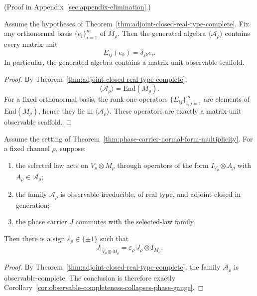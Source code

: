 (Proof in Appendix~\ref{sec:appendix-elimination}.)

\begin{corollary}
\label{cor:adjoint-closed-real-type-matrix-units}
Assume the hypotheses of
Theorem~\ref{thm:adjoint-closed-real-type-complete}. Fix any orthonormal basis
$\{e_i\}_{i=1}^m$ of $M_{\rho}$. Then the generated algebra
$\langle\mathcal A_{\rho}\rangle$ contains every matrix unit
\[
E_{ij}(e_k)=\delta_{jk}e_i.
\]
In particular, the generated algebra contains a matrix-unit observable
scaffold.
\end{corollary}

\begin{proof}
By Theorem~\ref{thm:adjoint-closed-real-type-complete},
\[
\langle\mathcal A_{\rho}\rangle=\mathrm{End}(M_{\rho}).
\]
For a fixed orthonormal basis, the rank-one operators $\{E_{ij}\}_{i,j=1}^m$
are elements of $\mathrm{End}(M_{\rho})$, hence they lie in
$\langle\mathcal A_{\rho}\rangle$. These operators are exactly a matrix-unit
observable scaffold.
\end{proof}

\begin{corollary}
\label{cor:adjoint-closed-real-type-phase}
Assume the setting of
Theorem~\ref{thm:phase-carrier-normal-form-multiplicity}. For a fixed channel
$\rho$, suppose:
\begin{enumerate}[label=(\roman*), leftmargin=2em, itemsep=0.2em]
\item the selected law acts on $V_{\rho}\otimes M_{\rho}$ through operators of
      the form $I_{V_{\rho}}\otimes A_{\rho}$ with
      $A_{\rho}\in\mathcal A_{\rho}$;
\item the family $\mathcal A_{\rho}$ is observable-irreducible, of real type,
      and adjoint-closed in generation;
\item the phase carrier $J$ commutes with the selected-law family.
\end{enumerate}
Then there is a sign $\varepsilon_{\rho}\in\{\pm1\}$ such that
\[
J|_{V_{\rho}\otimes M_{\rho}}
=
\varepsilon_{\rho}\,J_{\rho}\otimes I_{M_{\rho}}.
\]
\end{corollary}

\begin{proof}
By Theorem~\ref{thm:adjoint-closed-real-type-complete}, the family
$\mathcal A_{\rho}$ is observable-complete. The conclusion is therefore
exactly Corollary~\ref{cor:observable-completeness-collapses-phase-gauge}.
\end{proof}


